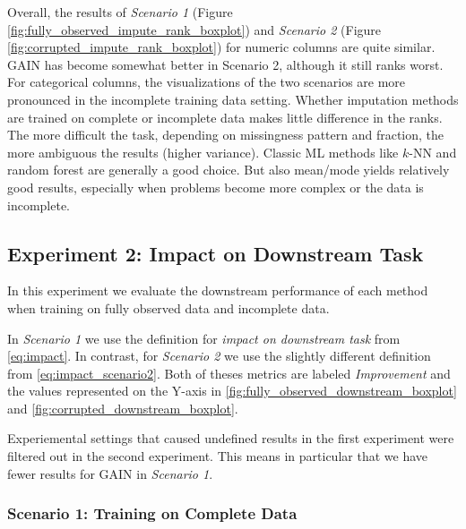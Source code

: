 Overall, the results of \textit{Scenario 1} (Figure \ref{fig:fully_observed_impute_rank_boxplot}) and \textit{Scenario 2} (Figure \ref{fig:corrupted_impute_rank_boxplot}) for numeric columns are quite similar. GAIN has become somewhat better in Scenario 2, although it still ranks worst. For categorical columns, the visualizations of the two scenarios are more pronounced in the incomplete training data setting. Whether imputation methods are trained on complete or incomplete data makes little difference in the ranks. The more difficult the task, depending on missingness pattern and fraction, the more ambiguous the results (higher variance). Classic ML methods like $k$-NN and random forest are generally a good choice. But also mean/mode yields relatively good results, especially when problems become more complex or the data is incomplete.


\subsection{Experiment 2: Impact on Downstream Task}

In this experiment we evaluate the downstream performance of each method when training on fully observed data and incomplete data.

In \textit{Scenario 1} we use the definition for \textit{impact on downstream task} from \autoref{eq:impact}. In contrast, for \textit{Scenario 2} we use the slightly different definition from \autoref{eq:impact_scenario2}. Both of theses metrics are labeled \textit{Improvement} and the values represented on the Y-axis in \autoref{fig:fully_observed_downstream_boxplot} and \autoref{fig:corrupted_downstream_boxplot}.

Experiemental settings that caused undefined results in the first experiment were filtered out in the second experiment. This means in particular that we have fewer results for GAIN in \textit{Scenario 1}.




\subsubsection{Scenario 1: Training on Complete Data}

